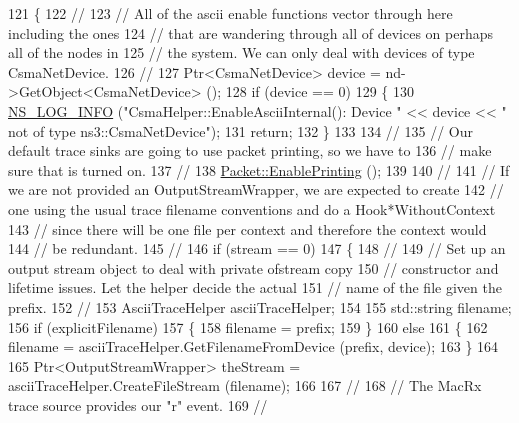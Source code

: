 \begin{DoxyCode}
121 \{
122   \textcolor{comment}{//}
123   \textcolor{comment}{// All of the ascii enable functions vector through here including the ones}
124   \textcolor{comment}{// that are wandering through all of devices on perhaps all of the nodes in}
125   \textcolor{comment}{// the system.  We can only deal with devices of type CsmaNetDevice.}
126   \textcolor{comment}{//}
127   Ptr<CsmaNetDevice> device = nd->GetObject<CsmaNetDevice> ();
128   \textcolor{keywordflow}{if} (device == 0)
129     \{
130       \hyperlink{group__logging_gafbd73ee2cf9f26b319f49086d8e860fb}{NS\_LOG\_INFO} (\textcolor{stringliteral}{"CsmaHelper::EnableAsciiInternal(): Device "} << device << \textcolor{stringliteral}{" not of type
       ns3::CsmaNetDevice"});
131       \textcolor{keywordflow}{return};
132     \}
133 
134   \textcolor{comment}{//}
135   \textcolor{comment}{// Our default trace sinks are going to use packet printing, so we have to }
136   \textcolor{comment}{// make sure that is turned on.}
137   \textcolor{comment}{//}
138   \hyperlink{classns3_1_1Packet_ae17c0cd8e63e83df3c9273801e3d5d7f}{Packet::EnablePrinting} ();
139 
140   \textcolor{comment}{//}
141   \textcolor{comment}{// If we are not provided an OutputStreamWrapper, we are expected to create }
142   \textcolor{comment}{// one using the usual trace filename conventions and do a Hook*WithoutContext}
143   \textcolor{comment}{// since there will be one file per context and therefore the context would}
144   \textcolor{comment}{// be redundant.}
145   \textcolor{comment}{//}
146   \textcolor{keywordflow}{if} (stream == 0)
147     \{
148       \textcolor{comment}{//}
149       \textcolor{comment}{// Set up an output stream object to deal with private ofstream copy }
150       \textcolor{comment}{// constructor and lifetime issues.  Let the helper decide the actual}
151       \textcolor{comment}{// name of the file given the prefix.}
152       \textcolor{comment}{//}
153       AsciiTraceHelper asciiTraceHelper;
154 
155       std::string filename;
156       \textcolor{keywordflow}{if} (explicitFilename)
157         \{
158           filename = prefix;
159         \}
160       \textcolor{keywordflow}{else}
161         \{
162           filename = asciiTraceHelper.GetFilenameFromDevice (prefix, device);
163         \}
164 
165       Ptr<OutputStreamWrapper> theStream = asciiTraceHelper.CreateFileStream (filename);
166 
167       \textcolor{comment}{//}
168       \textcolor{comment}{// The MacRx trace source provides our "r" event.}
169       \textcolor{comment}{//}

\end{DoxyCode}
